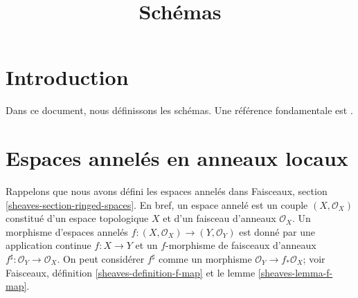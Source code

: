 

%


\title{Schémas}


\maketitle

\label{section-phantom}

\tableofcontents

\section{Introduction}
\label{section-introduction}

\noindent
Dans ce document, nous définissons les schémas.
Une référence fondamentale est \cite{EGA}.









\section{Espaces annelés en anneaux locaux}
\label{section-locally-ringed-spaces}

\noindent
Rappelons que nous avons défini les espaces annelés
dans Faisceaux, section \ref{sheaves-section-ringed-spaces}.
En bref, un espace annelé est un couple $(X, \mathcal{O}_X)$ constitué
d'un espace topologique $X$ et d'un faisceau d'anneaux $\mathcal{O}_X$.
Un morphisme d'espaces annelés $f : (X, \mathcal{O}_X) \to (Y, \mathcal{O}_Y)$
est donné par une application continue $f : X \to Y$ et un $f$-morphisme de faisceaux
d'anneaux $f^\sharp : \mathcal{O}_Y \to \mathcal{O}_X$. On peut
considérer $f^\sharp$ comme un morphisme $\mathcal{O}_Y \to f_*\mathcal{O}_X$; voir
Faisceaux, définition \ref{sheaves-definition-f-map} et le
lemme \ref{sheaves-lemma-f-map}.

